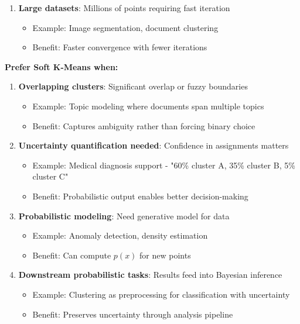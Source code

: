 \documentclass[12pt]{article}
\begin{document}
\begin{solution}
\begin{enumerate}
    \item \textbf{Large datasets}: Millions of points requiring fast iteration
    \begin{itemize}
        \item Example: Image segmentation, document clustering
        \item Benefit: Faster convergence with fewer iterations
    \end{itemize}
\end{enumerate}

\textbf{Prefer Soft K-Means when:}

\begin{enumerate}
    \item \textbf{Overlapping clusters}: Significant overlap or fuzzy boundaries
    \begin{itemize}
        \item Example: Topic modeling where documents span multiple topics
        \item Benefit: Captures ambiguity rather than forcing binary choice
    \end{itemize}

    \item \textbf{Uncertainty quantification needed}: Confidence in assignments matters
    \begin{itemize}
        \item Example: Medical diagnosis support - "60\% cluster A, 35\% cluster B, 5\% cluster C"
        \item Benefit: Probabilistic output enables better decision-making
    \end{itemize}

    \item \textbf{Probabilistic modeling}: Need generative model for data
    \begin{itemize}
        \item Example: Anomaly detection, density estimation
        \item Benefit: Can compute $p(x)$ for new points
    \end{itemize}

    \item \textbf{Downstream probabilistic tasks}: Results feed into Bayesian inference
    \begin{itemize}
        \item Example: Clustering as preprocessing for classification with uncertainty
        \item Benefit: Preserves uncertainty through analysis pipeline
    \end{itemize}


\end{enumerate}
\end{solution}
\end{document}
